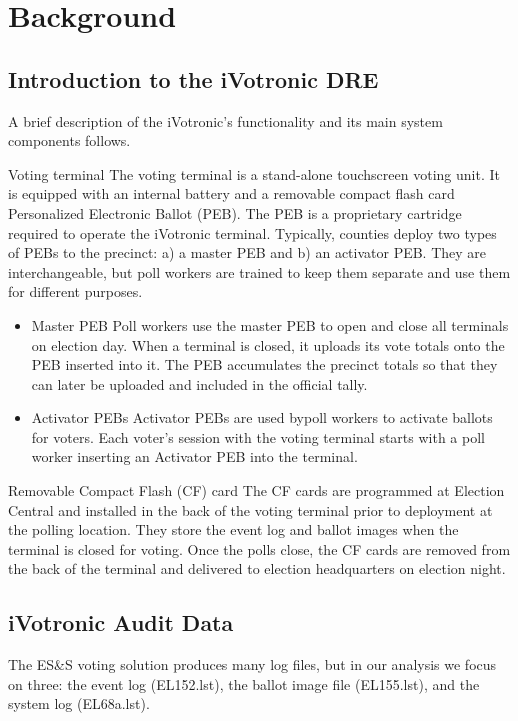 \documentclass[letterpaper,twocolumn,10pt]{article}
\begin{document}
\section{Background}
\subsection{Introduction to the iVotronic DRE}
A brief description of the iVotronic's functionality and its main system
components follows.  

\begin{description}
\item{Voting terminal} The voting terminal is a stand-alone touchscreen voting
  unit. It is equipped with an internal battery and a removable compact flash
  card Personalized Electronic Ballot (PEB). The PEB is a proprietary cartridge
  required to operate the iVotronic terminal. Typically, counties deploy two
  types of PEBs to the precinct: a) a master PEB and b) an activator PEB. They
  are interchangeable, but poll workers are trained to keep them separate and
  use them for different purposes.
\begin{itemize}
\item{Master PEB} Poll workers use the master PEB to open and close all
  terminals on election day. When a terminal is closed, it uploads its vote
  totals onto the PEB inserted into it. The PEB accumulates the precinct totals
  so that they can later be uploaded and included in the official tally.
\item{Activator PEBs} Activator PEBs are used bypoll workers to activate ballots
  for voters. Each voter’s session with the voting terminal starts with a poll
  worker inserting an Activator PEB into the terminal. 
\end{itemize}
\item{Removable Compact Flash (CF) card} The CF cards are programmed at Election
  Central and installed in the back of the voting terminal prior to deployment
  at the polling location. They store the event log and ballot images when the
  terminal is closed for voting. Once the polls close, the CF cards are removed
  from the back of the terminal and delivered to election headquarters on
  election night.
\end{description}

\subsection{iVotronic Audit Data}
The ES\&S voting solution produces many log files, but in our analysis we focus
on three: the event log (EL152.lst), the ballot image file (EL155.lst), and the
system log (EL68a.lst). 
\end{document}
